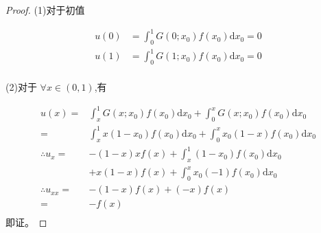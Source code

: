 \documentclass{article}%
\begin{document}
\begin{proof}

	(1)对于初值

\begin{align*}
	u\left ( 0 \right )&=\int_{0}^{1}G\left ( 0;x_0 \right )f\left ( x_0 \right )\mathrm{d}x_0=0 \\
	u\left ( 1 \right )&=\int_{0}^{1}G\left ( 1;x_0 \right )f\left ( x_0 \right )\mathrm{d}x_0=0 \\
\end{align*}

(2)对于 $\forall x\in\left ( 0,1 \right )$,有

\begin{align*}
		u\left ( x \right )=&\int_{x}^{1}G\left ( x;x_0 \right )f\left ( x_0 \right )\mathrm{d}x_0+\int_{0}^{x}G\left ( x;x_0 \right )f\left ( x_0 \right )\mathrm{d}x_0\\
	=&\int_{x}^{1}x\left ( 1-x_0 \right )f\left ( x_0 \right )\mathrm{d}x_0+\int_{0}^{x}x_0\left ( 1-x \right )f\left ( x_0 \right )\mathrm{d}x_0\\
	\therefore u_x=&-\left ( 1-x \right )xf\left ( x \right )+\int_{x}^{1}\left ( 1-x_0 \right )f\left ( x_0 \right )\mathrm{d}x_0 \\
	&+x\left ( 1-x \right )f\left ( x \right )+\int_{0}^{x}x_0\left ( -1 \right ) f\left ( x_0 \right )\mathrm{d}x_0\\
	\therefore u_{xx}=&-\left ( 1-x \right )f\left ( x \right )+\left ( -x \right )f\left ( x \right )\\
	=&-f\left ( x \right )\\
\end{align*}
	即证。
\end{proof}
\end{document}
